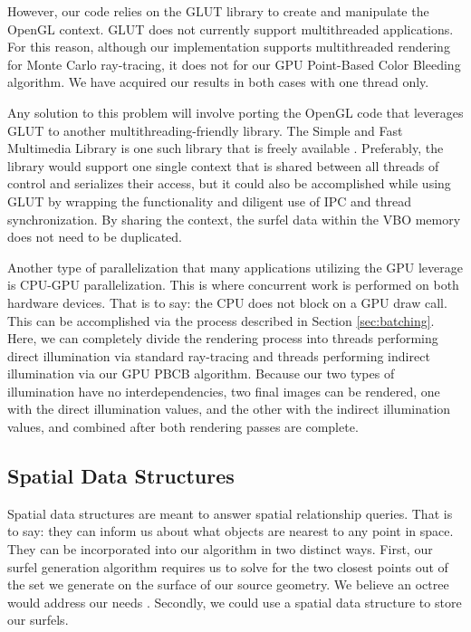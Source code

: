 However, our code relies on the GLUT library \cite{bib:glut} to create and manipulate the OpenGL context. GLUT does not currently support multithreaded applications. For this reason, although our implementation supports multithreaded rendering for Monte Carlo ray-tracing, it does not for our GPU Point-Based Color Bleeding algorithm. We have acquired our results in both cases with one thread only.
 
Any solution to this problem will involve porting the OpenGL code that leverages GLUT to another multithreading-friendly library. The Simple and Fast Multimedia Library is one such library that is freely available \cite{bib:sfml}. Preferably, the library would support one single context that is shared between all threads of control and serializes their access, but it could also be accomplished while using GLUT by wrapping the functionality and diligent use of IPC and thread synchronization. By sharing the context, the surfel data within the VBO memory does not need to be duplicated.

Another type of parallelization that many applications utilizing the GPU leverage is CPU-GPU parallelization. This is where concurrent work is performed on both hardware devices. That is to say: the CPU does not block on a GPU draw call. This can be accomplished via the process described in Section \ref{sec:batching}. Here, we can completely divide the rendering process into threads performing direct illumination via standard ray-tracing and threads performing indirect illumination via our GPU PBCB algorithm. Because our two types of illumination have no interdependencies, two final images can be rendered, one with the direct illumination values, and the other with the indirect illumination values, and combined after both rendering passes are complete.

\subsection{Spatial Data Structures}
\label{sec:future_spatial}
Spatial data structures are meant to answer spatial relationship queries. That is to say: they can inform us about what objects are nearest to any point in space. They can be incorporated into our algorithm in two distinct ways. First, our surfel generation algorithm requires us to solve for the two closest points out of the set we generate on the surface of our source geometry. We believe an octree would address our needs \cite{bib:rtr}. Secondly, we could use a spatial data structure to store our surfels.

